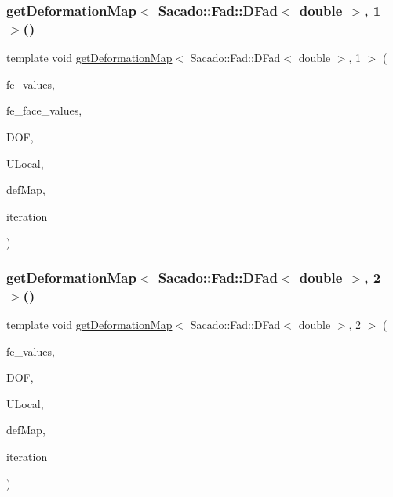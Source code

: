 \subsubsection{\texorpdfstring{getDeformationMap$<$ Sacado::Fad::DFad$<$ double $>$, 1 $>$()}{getDeformationMap< Sacado::Fad::DFad< double >, 1 >()}\hspace{0.1cm}{\footnotesize\ttfamily [2/2]}}
{\footnotesize\ttfamily template void \mbox{\hyperlink{group___evaluation_functions_ga239b206235603af9482484c29c8d57ea}{get\+Deformation\+Map}}$<$ Sacado\+::\+Fad\+::\+D\+Fad$<$ double $>$, 1 $>$ (\begin{DoxyParamCaption}\item[{const F\+E\+Values$<$ 1 $>$ \&}]{fe\+\_\+values,  }\item[{const F\+E\+Face\+Values$<$ 1 $>$ \&}]{fe\+\_\+face\+\_\+values,  }\item[{unsigned int}]{D\+OF,  }\item[{Table$<$ 1, Sacado\+::\+Fad\+::\+D\+Fad$<$ double $>$$>$ \&}]{U\+Local,  }\item[{\mbox{\hyperlink{structdeformation_map}{deformation\+Map}}$<$ Sacado\+::\+Fad\+::\+D\+Fad$<$ double $>$, 1 $>$ \&}]{def\+Map,  }\item[{unsigned int}]{iteration }\end{DoxyParamCaption})}

\mbox{\label{function_evaluations_8cc_a024d1c1e0bf1b0c62eb8e8eba210e04f}} 
\subsubsection{\texorpdfstring{getDeformationMap$<$ Sacado::Fad::DFad$<$ double $>$, 2 $>$()}{getDeformationMap< Sacado::Fad::DFad< double >, 2 >()}\hspace{0.1cm}{\footnotesize\ttfamily [1/2]}}
{\footnotesize\ttfamily template void \mbox{\hyperlink{group___evaluation_functions_ga239b206235603af9482484c29c8d57ea}{get\+Deformation\+Map}}$<$ Sacado\+::\+Fad\+::\+D\+Fad$<$ double $>$, 2 $>$ (\begin{DoxyParamCaption}\item[{const F\+E\+Values$<$ 2 $>$ \&}]{fe\+\_\+values,  }\item[{unsigned int}]{D\+OF,  }\item[{Table$<$ 1, Sacado\+::\+Fad\+::\+D\+Fad$<$ double $>$$>$ \&}]{U\+Local,  }\item[{\mbox{\hyperlink{structdeformation_map}{deformation\+Map}}$<$ Sacado\+::\+Fad\+::\+D\+Fad$<$ double $>$, 2 $>$ \&}]{def\+Map,  }\item[{unsigned int}]{iteration }\end{DoxyParamCaption})}

